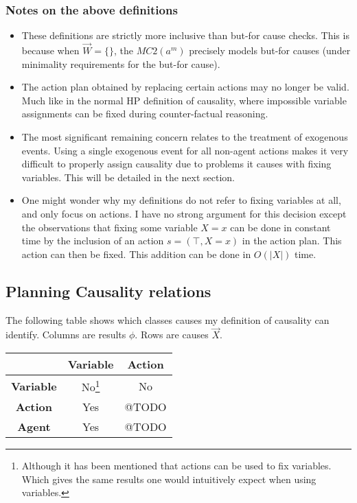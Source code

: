 \documentclass{article}
\theoremstyle{plain}
\theoremstyle{definition}
\begin{document}
\subsubsection*{Notes on the above definitions}
\begin{itemize}
\item These definitions are strictly more inclusive than but-for cause checks. This is because when $\vec{W}=\{\}$, the $MC2(a^m)$ precisely models but-for causes (under minimality requirements for the but-for cause).
\item The action plan obtained by replacing certain actions may no longer be valid. Much like in the normal HP definition of causality, where impossible variable assignments can be fixed during counter-factual reasoning.
\item The most significant remaining concern relates to the treatment of exogenous events. Using a single exogenous event for all non-agent actions makes it very difficult to properly assign causality due to problems it causes with fixing variables. This will be detailed in the next section.
\item One might wonder why my definitions do not refer to fixing variables at all, and only focus on actions. I have no strong argument for this decision except the observations that fixing some variable $X=x$ can be done in constant time by the inclusion of an action $s=(\top,X=x)$ in the action plan. This action can then be fixed. This addition can be done in $O(|X|)$ time.
\end{itemize}



\iffalse
\subsection{Planning Causality relations}

The following table shows which classes causes my definition of causality can identify. Columns are results $\phi$. Rows are causes $\vec{X}$.

\begin{center}
\begin{tabular}{ |c|c|c| }
\hline 
  & \textbf{Variable} & \textbf{Action} \\
 \hline 
 \textbf{Variable} & No\footnote{Although it has been mentioned that actions can be used to fix variables. Which gives the same results one would intuitively expect when using variables.} & No \\ 
 \hline
 \textbf{Action} & Yes & @TODO \\ 
 \hline
 \textbf{Agent} & Yes & @TODO\\
 \hline
\end{tabular}
\end{center}
\end{document}
